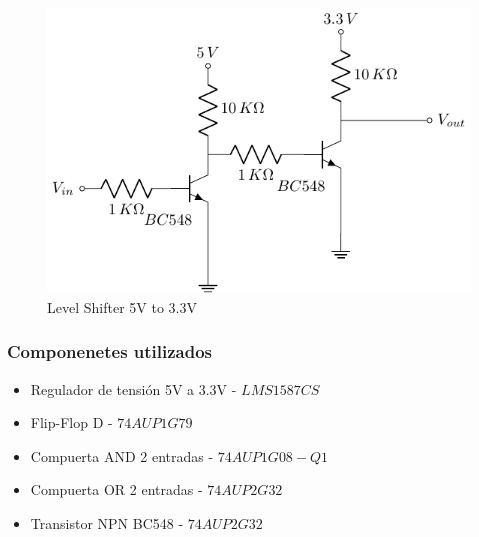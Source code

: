  \begin{figure}[H]
\begin{center}
\includegraphics[scale=0.75]{Ejercicio3/Circuitos/5Vto3_3V}
\caption{Level Shifter 5V to 3.3V}
\end{center}
\label{5vto33v}
\end{figure}

\subsubsection{Componenetes utilizados}
\begin{itemize}
\item Regulador de tensión 5V a 3.3V - $LMS1587CS$
\item Flip-Flop D - $74AUP1G79$
\item Compuerta AND 2 entradas - $74AUP1G08-Q1$
\item Compuerta OR 2 entradas - $74AUP2G32$
\item Transistor NPN BC548 - $74AUP2G32$
\end{itemize}





